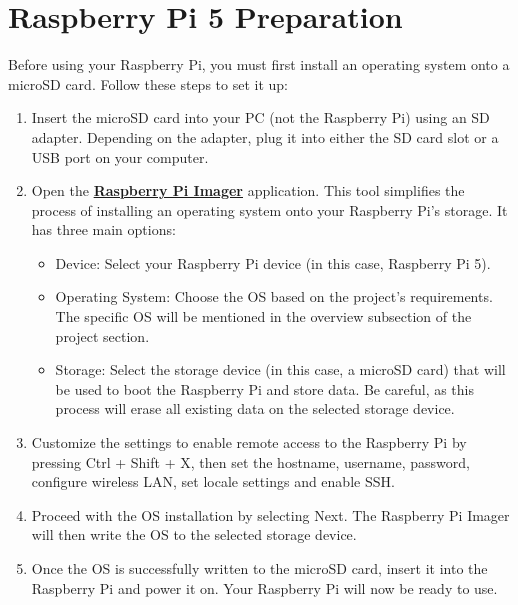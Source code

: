 \section*{ Raspberry Pi 5 Preparation}

Before using your Raspberry Pi, you must first install an operating system onto a microSD card. Follow these steps to set it up:
\begin{enumerate}
    \item Insert the microSD card into your PC (not the Raspberry Pi) using an SD adapter. Depending on the adapter, plug it into either the SD card slot or a USB port on your computer.
    \item Open the \href{https://www.raspberrypi.com/software}{\textbf{\color{blue}Raspberry Pi Imager}} application. This tool simplifies the process of installing an operating system onto your Raspberry Pi’s storage. It has three main options:
    \begin{itemize}
        \item Device: Select your Raspberry Pi device (in this case, Raspberry Pi 5).
        \item Operating System: Choose the OS based on the project’s requirements. The specific OS will be mentioned in the overview subsection of the project section.
        \item Storage: Select the storage device (in this case, a microSD card) that will be used to boot the Raspberry Pi and store data. Be careful, as this process will erase all existing data on the selected storage device.
    \end{itemize}
    \item Customize the settings to enable remote access to the Raspberry Pi by pressing Ctrl + Shift + X, then set the hostname, username, password, configure wireless LAN, set locale settings and enable SSH.
    \item Proceed with the OS installation by selecting Next. The Raspberry Pi Imager will then write the OS to the selected storage device.
    \item Once the OS is successfully written to the microSD card, insert it into the Raspberry Pi and power it on. Your Raspberry Pi will now be ready to use.
\end{enumerate}

